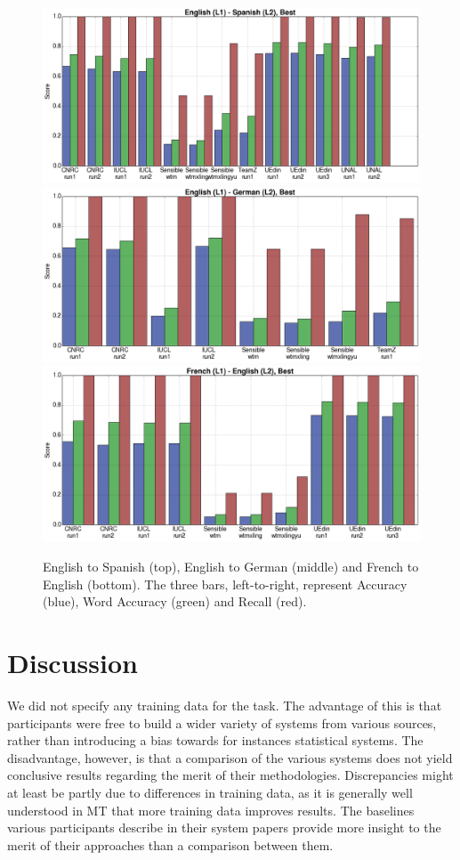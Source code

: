  
\begin{figure}[p]
\includegraphics[width=16cm]{en-es-best-2.png}
\includegraphics[width=16cm]{en-de-best-2.png}
\includegraphics[width=16cm]{fr-en-best-2.png}
\caption{English to Spanish (top), English to German (middle) and French to English (bottom). The three bars, left-to-right, represent Accuracy (blue), Word Accuracy (green) and Recall (red).}
\label{fig:graphs}
\end{figure}

\section{Discussion}

We did not specify any training data for the task. The advantage of this is
that participants were free to build a wider variety of systems from various
sources, rather than introducing a bias towards for instances statistical
systems. The disadvantage, however, is that a comparison of the various systems
does not yield conclusive results regarding the merit of their methodologies.
Discrepancies might at least be partly due to differences in training data, as
it is generally well understood in MT that more training data improves results.
The baselines various participants describe in their system papers provide more
insight to the merit of their approaches than a comparison between them.
 

